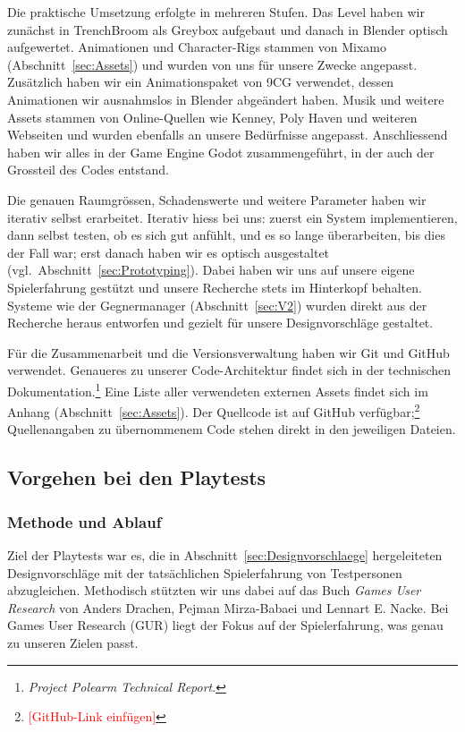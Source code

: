 \documentclass[../Main.tex]{subfiles}
\begin{document}
Die praktische Umsetzung erfolgte in mehreren Stufen. Das Level haben wir zunächst in TrenchBroom als Greybox aufgebaut und danach in Blender optisch aufgewertet. Animationen und Character-Rigs stammen von Mixamo (Abschnitt~\ref{sec:Assets}) und wurden von uns für unsere Zwecke angepasst. Zusätzlich haben wir ein Animationspaket von 9CG verwendet, dessen Animationen wir ausnahmslos in Blender abgeändert haben. Musik und weitere Assets stammen von Online-Quellen wie Kenney, Poly Haven und weiteren Webseiten und wurden ebenfalls an unsere Bedürfnisse angepasst. Anschliessend haben wir alles in der Game Engine Godot zusammengeführt, in der auch der Grossteil des Codes entstand.

Die genauen Raumgrössen, Schadenswerte und weitere Parameter haben wir iterativ selbst erarbeitet. Iterativ hiess bei uns: zuerst ein System implementieren, dann selbst testen, ob es sich gut anfühlt, und es so lange überarbeiten, bis dies der Fall war; erst danach haben wir es optisch ausgestaltet (vgl.\ Abschnitt~\ref{sec:Prototyping}). Dabei haben wir uns auf unsere eigene Spielerfahrung gestützt und unsere Recherche stets im Hinterkopf behalten. Systeme wie der Gegnermanager (Abschnitt~\ref{sec:V2}) wurden direkt aus der Recherche heraus entworfen und gezielt für unsere Designvorschläge gestaltet.

Für die Zusammenarbeit und die Versionsverwaltung haben wir Git und GitHub verwendet. Genaueres zu unserer Code-Architektur findet sich in der technischen Dokumentation.\footnote{\textit{Project Polearm Technical Report}.} Eine Liste aller verwendeten externen Assets findet sich im Anhang (Abschnitt~\ref{sec:Assets}). Der Quellcode ist auf GitHub verfügbar;\footnote{\textcolor{red}{[GitHub-Link einfügen]}} Quellenangaben zu übernommenem Code stehen direkt in den jeweiligen Dateien.

\subsection{Vorgehen bei den Playtests} \label{sec:VorgehenPlaytest}

\subsubsection{Methode und Ablauf} \label{sec:MethodePlaytest}
Ziel der Playtests war es, die in Abschnitt~\ref{sec:Designvorschlaege} hergeleiteten Designvorschläge mit der tatsächlichen Spielerfahrung von Testpersonen abzugleichen. Methodisch stützten wir uns dabei auf das Buch \textit{Games User Research} von Anders Drachen, Pejman Mirza-Babaei und Lennart E. Nacke.\autocite{drachen2018gamesuserresearch} Bei Games User Research (GUR) liegt der Fokus auf der Spielerfahrung,\autocite[2]{drachen2018gamesuserresearch} was genau zu unseren Zielen passt.
\end{document}
